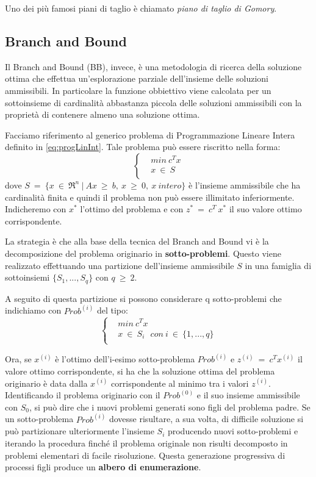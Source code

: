 Uno dei più famosi piani di taglio è chiamato \textit{piano di taglio di Gomory}.
\subsection{Branch and Bound}
Il Branch and Bound (BB), invece, è una metodologia di ricerca della soluzione ottima che effettua un'esplorazione parziale dell'insieme delle soluzioni ammissibili. In particolare la funzione obbiettivo viene calcolata per un sottoinsieme di cardinalità abbastanza piccola delle soluzioni ammissibili con la proprietà di contenere almeno una soluzione ottima.

Facciamo riferimento al generico problema di Programmazione Lineare Intera definito in \eqref{eq:progLinInt}. Tale problema può essere riscritto nella forma:
\begin{equation}
\label{eq:probLin2}
\begin{cases}
& min ~ c^T x \\
& x ~ \in ~ S \\
\end{cases}
\end{equation}
dove $S ~ = ~ \{x ~ \in ~ \Re^n ~ | ~ Ax ~ \geq ~ b, ~ x ~ \geq ~ 0, ~ x ~ intero\}$ è l'insieme ammissibile che ha cardinalità finita e quindi il problema non può essere illimitato inferiormente.
Indicheremo con $x^*$ l'ottimo del problema e con $z^* ~ = ~ c^T ~ x^*$ il suo valore ottimo corrispondente.

La strategia è che alla base della tecnica del Branch and Bound vi è la decomposizione del problema originario in \textbf{sotto-problemi}.
Questo viene realizzato effettuando una partizione dell'insieme ammissibile $S$ in una famiglia di sottoinsiemi $\{S_1,...,S_q\}$ con $q ~ \geq ~ 2$.

A seguito di questa partizione si possono considerare q sotto-problemi che indichiamo con $Prob^{(i)}$ del tipo: 
\begin{equation}
\label{eq:sottoProb}
\begin{cases}
& min ~ c^T x \\
& x ~ \in ~ S_i ~~~ con ~ i ~ \in ~ \{1,...,q\} \\
\end{cases}
\end{equation}

Ora, se $x^{(i)}$ è l'ottimo dell'i-esimo sotto-problema $Prob^{(i)}$ e $z^{(i)} ~ = ~ c^T x^{(i)}$ il valore ottimo corrispondente, si ha che la soluzione ottima del problema originario è data dalla $x^{(i)}$ corrispondente al minimo tra i valori $z^{(i)}$.
Identificando il problema originario con il $Prob^{(0)}$ e il suo insieme ammissibile con $S_0$, si può dire che i nuovi problemi generati sono figli del problema padre.
Se un sotto-problema $Prob^{(i)}$ dovesse risultare, a sua volta, di difficile soluzione si può partizionare ulteriormente l'insieme $S_i$ producendo nuovi sotto-problemi e iterando la procedura finché il problema originale non risulti decomposto in problemi elementari di facile risoluzione.
Questa generazione progressiva di processi figli produce un \textbf{albero di enumerazione}.\\

